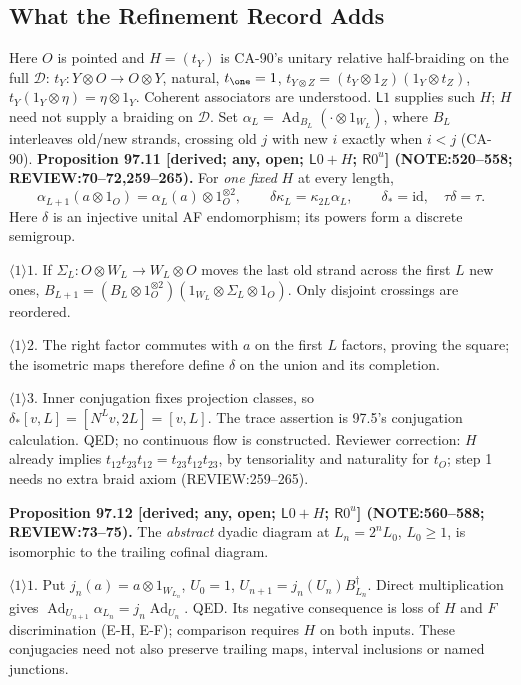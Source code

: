 \subsection{What the Refinement Record Adds}

Here \(O\) is pointed and \(H=(t_Y)\) is CA-90's unitary relative half-braiding on the full \(\mathcal D\):
\(t_Y:Y\otimes O\to O\otimes Y\), natural, \(t_\one=1\), \(t_{Y\otimes Z}=(t_Y\otimes1_Z)(1_Y\otimes t_Z)\),
\(t_Y(1_Y\otimes\eta)=\eta\otimes1_Y\). Coherent associators are understood. \(\mathsf L1\) supplies such \(H\);
\(H\) need not supply a braiding on \(\mathcal D\). Set \(\alpha_L=\operatorname{Ad}_{B_L}(\cdot\otimes1_{W_L})\),
where \(B_L\) interleaves old/new strands, crossing old \(j\) with new \(i\) exactly when \(i<j\) (CA-90).
\textbf{Proposition 97.11 [derived; any, open; \(\mathsf L0+H\); \(\mathsf R0^u\)] (NOTE:520--558; REVIEW:70--72,259--265).}
For \emph{one fixed} \(H\) at every length,
\begin{equation}\label{eq:97-square}
 \alpha_{L+1}(a\otimes1_O)=\alpha_L(a)\otimes1_O^{\otimes2},\qquad
 \delta\kappa_L=\kappa_{2L}\alpha_L,\qquad \delta_*=\mathrm{id},\quad\tau\delta=\tau .
\end{equation}
Here \(\delta\) is an injective unital AF endomorphism; its powers form a discrete semigroup.
\par\(\langle1\rangle1\). If \(\Sigma_L:O\otimes W_L\to W_L\otimes O\) moves the last old strand across the first \(L\) new ones,
\(B_{L+1}=(B_L\otimes1_O^{\otimes2})(1_{W_L}\otimes\Sigma_L\otimes1_O)\). Only disjoint crossings are reordered.
\par\(\langle1\rangle2\). The right factor commutes with \(a\) on the first \(L\) factors, proving the square;
the isometric maps therefore define \(\delta\) on the union and its completion.
\par\(\langle1\rangle3\). Inner conjugation fixes projection classes, so \(\delta_*[v,L]=[N^Lv,2L]=[v,L]\).
The trace assertion is 97.5's conjugation calculation. QED; no continuous flow is constructed.
Reviewer correction: \(H\) already implies \(t_{12}t_{23}t_{12}=t_{23}t_{12}t_{23}\), by tensoriality and naturality
for \(t_O\); step 1 needs no extra braid axiom (REVIEW:259--265).

\textbf{Proposition 97.12 [derived; any, open; \(\mathsf L0+H\); \(\mathsf R0^u\)] (NOTE:560--588; REVIEW:73--75).}
The \emph{abstract} dyadic diagram at \(L_n=2^nL_0\), \(L_0\ge1\), is isomorphic to the trailing cofinal diagram.
\par\(\langle1\rangle1\). Put \(j_n(a)=a\otimes1_{W_{L_n}}\), \(U_0=1\), \(U_{n+1}=j_n(U_n)B_{L_n}^\dagger\).
Direct multiplication gives \(\operatorname{Ad}_{U_{n+1}}\alpha_{L_n}=j_n\operatorname{Ad}_{U_n}\). QED.
Its negative consequence is loss of \(H\) and \(F\) discrimination (E-H, E-F); comparison requires \(H\) on both inputs.
These conjugacies need not also preserve trailing maps, interval inclusions or named junctions.

